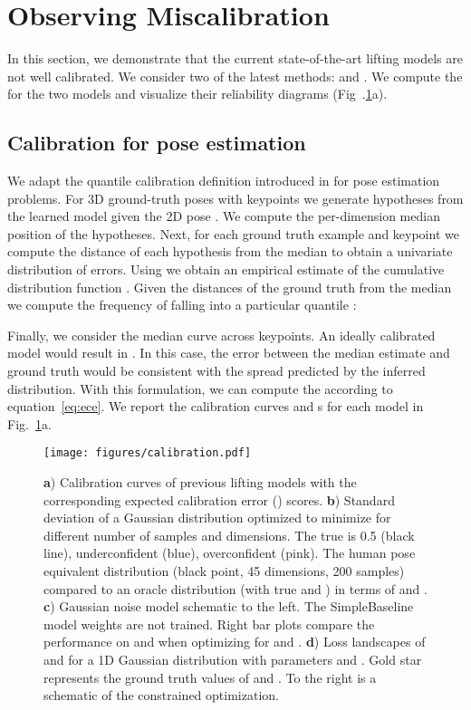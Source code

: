 \documentclass{article} \usepackage{iclr2023_conference,times}
\def\eqref#1{equation~\ref{#1}}
\begin{document}
\section{Observing Miscalibration}
\label{sec:observing_miscalibration}
    In this section, we demonstrate that the current state-of-the-art lifting models are not well calibrated.
    We consider two of the latest methods: \citet{Sharma_Varigonda_Bindal_Sharma_Jain_2019} and \citet{Wehrbein_Rudolph_Rosenhahn_Wandt_2021}.
    We compute the  for the two models and visualize their reliability diagrams (Fig~.\ref{fig:calibration}a).
    \subsection{Calibration for pose estimation}
    We adapt the quantile calibration definition introduced in \citet{Song2019} for pose estimation problems.
    For  3D ground-truth poses with  keypoints  we generate  hypotheses  from the learned model  given the 2D pose .
    We compute the per-dimension median position  of the hypotheses.
    Next, for each ground truth example  and keypoint  we compute the  distance of each hypothesis  from the median  to obtain a univariate distribution of errors.
    Using  we obtain an empirical estimate of the cumulative distribution function .
    Given the distances  of the ground truth  from the median  we compute the frequency  of  falling into a particular quantile :
    
    Finally, we consider the median curve  across  keypoints.
    An ideally calibrated model would result in .
    In this case, the error between the median estimate and ground truth would be consistent with the spread predicted by the inferred distribution.  
    With this formulation, we can compute the  according to \eqref{eq:ece}.
    We report the calibration curves  and s for each model in Fig.~\ref{fig:calibration}a.
    \begin{figure}[t]
        \begin{center}
            \texttt{[image: figures/calibration.pdf]}
        \end{center}
        \caption{
        \textbf{a}) Calibration curves of previous lifting models with the corresponding expected calibration error () scores.
        \textbf{b}) Standard deviation  of a Gaussian distribution optimized to minimize  for different number of samples and dimensions. The true  is 0.5 (black line), underconfident  (blue), overconfident  (pink). The human pose equivalent distribution (black point, 45 dimensions, 200 samples) compared to an oracle distribution (with true  and ) in terms of  and .
        \textbf{c}) Gaussian noise model schematic to the left. The SimpleBaseline model weights are not trained. Right bar plots compare the performance on  and  when optimizing for  and .
        \textbf{d}) Loss landscapes of  and  for a 1D Gaussian distribution with parameters  and . Gold star represents the ground truth values of  and . To the right is a schematic of the  constrained optimization.
        }
        \label{fig:calibration}
    \end{figure}
  
\end{document}
